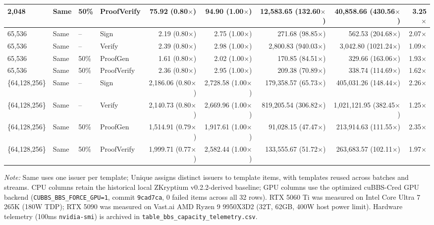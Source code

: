 \begin{table}[t]
{\begin{tabular}{llllrrrrr}
2,048 & Same & 50\% & ProofVerify & 75.92 (0.80$\times$) & 94.90 (1.00$\times$) & 12,583.65 (132.60$\times$) & 40,858.66 (430.56$\times$) & 3.25$\times$ \\
\midrule
65,536 & Same & -- & Sign & 2.19 (0.80$\times$) & 2.75 (1.00$\times$) & 271.68 (98.85$\times$) & 562.53 (204.68$\times$) & 2.07$\times$ \\
65,536 & Same & -- & Verify & 2.39 (0.80$\times$) & 2.98 (1.00$\times$) & 2,800.83 (940.03$\times$) & 3,042.80 (1021.24$\times$) & 1.09$\times$ \\
65,536 & Same & 50\% & ProofGen & 1.61 (0.80$\times$) & 2.02 (1.00$\times$) & 170.85 (84.51$\times$) & 329.66 (163.06$\times$) & 1.93$\times$ \\
65,536 & Same & 50\% & ProofVerify & 2.36 (0.80$\times$) & 2.95 (1.00$\times$) & 209.38 (70.89$\times$) & 338.74 (114.69$\times$) & 1.62$\times$ \\
\midrule
\{64,128,256\} & Same & -- & Sign & 2,186.06 (0.80$\times$) & 2,728.58 (1.00$\times$) & 179,358.57 (65.73$\times$) & 405,031.26 (148.44$\times$) & 2.26$\times$ \\
\{64,128,256\} & Same & -- & Verify & 2,140.73 (0.80$\times$) & 2,669.96 (1.00$\times$) & 819,205.54 (306.82$\times$) & 1,021,121.95 (382.45$\times$) & 1.25$\times$ \\
\{64,128,256\} & Same & 50\% & ProofGen & 1,514.91 (0.79$\times$) & 1,917.61 (1.00$\times$) & 91,028.15 (47.47$\times$) & 213,914.63 (111.55$\times$) & 2.35$\times$ \\
\{64,128,256\} & Same & 50\% & ProofVerify & 1,999.71 (0.77$\times$) & 2,582.44 (1.00$\times$) & 133,555.67 (51.72$\times$) & 263,683.57 (102.11$\times$) & 1.97$\times$ \\
\bottomrule
\end{tabular}%
}
\begin{minipage}{\textwidth}\footnotesize\textit{Note:} Same uses one issuer per template; Unique assigns distinct issuers to template items, with templates reused across batches and streams. CPU columns retain the historical local ZKryptium v0.2.2-derived baseline; GPU columns use the optimized cuBBS-Cred GPU backend (\texttt{CUBBS\_BBS\_FORCE\_GPU=1}, commit \texttt{9cad7ca}, 0 failed items across all 32 rows). RTX 5060 Ti was measured on Intel Core Ultra 7 265K (180W TDP); RTX 5090 was measured on Vast.ai AMD Ryzen 9 9950X3D2 (32T, 62GB, 400W host power limit). Hardware telemetry (100ms \texttt{nvidia-smi}) is archived in \texttt{table\_bbs\_capacity\_telemetry.csv}.\end{minipage}
\end{table}
